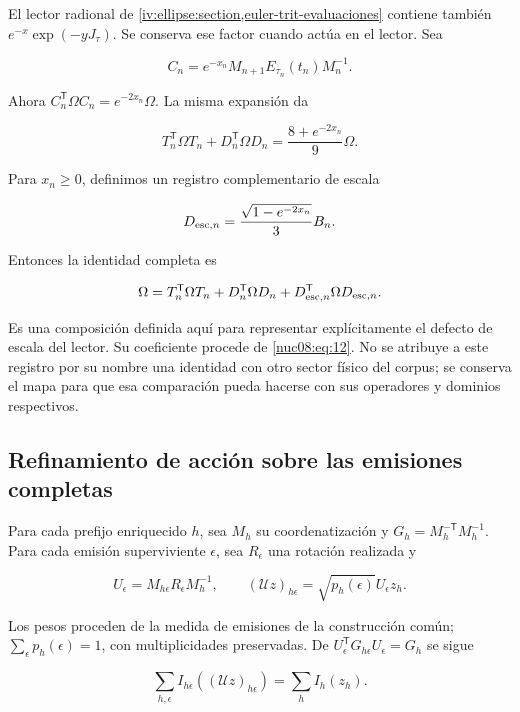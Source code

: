 El lector radional de \cref{iv:ellipse:section,euler-trit-evaluaciones} contiene también \(e^{-x}\exp(-yJ_\tau)\). Se conserva ese factor cuando actúa en el lector. Sea

\[
C_n=e^{-x_n}M_{n+1}E_{\tau_n}(t_n)M_n^{-1}.
\]

Ahora \(C_n^\mathsf T\Omega C_n=e^{-2x_n}\Omega\). La misma expansión da

\begin{equation}
T_n^\mathsf T\Omega T_n+D_n^\mathsf T\Omega D_n
=\frac{8+e^{-2x_n}}9\Omega.
\label{nuc08:eq:12}
\end{equation}

Para \(x_n\geq0\), definimos un registro complementario de escala

\[
D_{{\rm esc},n}=\frac{\sqrt{1-e^{-2x_n}}}{3}B_n.
\]

Entonces la identidad completa es

\begin{equation}
\Omega=T_n^\mathsf T\Omega T_n+D_n^\mathsf T\Omega D_n
+D_{{\rm esc},n}^\mathsf T\Omega D_{{\rm esc},n}.
\label{nuc08:eq:13}
\end{equation}

Es una composición definida aquí para representar explícitamente el defecto de escala del lector. Su coeficiente procede de \eqref{nuc08:eq:12}. No se atribuye a este registro por su nombre una identidad con otro sector físico del corpus; se conserva el mapa para que esa comparación pueda hacerse con sus operadores y dominios respectivos.

\subsection{Refinamiento de acción sobre las emisiones completas}

Para cada prefijo enriquecido \(h\), sea \(M_h\) su coordenatización y \(G_h=M_h^{-\mathsf T}M_h^{-1}\). Para cada emisión superviviente \(\epsilon\), sea \(R_\epsilon\) una rotación realizada y

\[
U_\epsilon=M_{h\epsilon}R_\epsilon M_h^{-1},\qquad
(\mathscr U z)_{h\epsilon}=\sqrt{p_h(\epsilon)}U_\epsilon z_h.
\]

Los pesos proceden de la medida de emisiones de la construcción común; \(\sum_\epsilon p_h(\epsilon)=1\), con multiplicidades preservadas. De \(U_\epsilon^\mathsf TG_{h\epsilon}U_\epsilon=G_h\) se sigue

\begin{equation}
\sum_{h,\epsilon}I_{h\epsilon}((\mathscr U z)_{h\epsilon})
=\sum_h I_h(z_h).
\label{nuc08:eq:14}
\end{equation}

